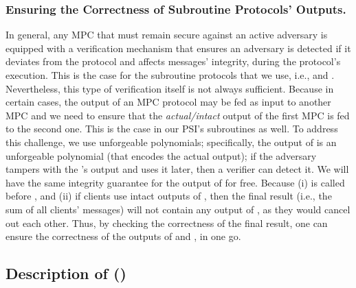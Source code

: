  \subsubsection{Ensuring the Correctness of Subroutine Protocols' Outputs.} 
 
 In general, any MPC that must remain secure against an active adversary is equipped with a verification mechanism that ensures an adversary is detected if it deviates from the protocol and affects messages' integrity, during the protocol's execution. This is the case for the subroutine protocols that we use, i.e., \vopr and \zspaa. Nevertheless, this type of verification itself is not always sufficient. Because in certain cases, the output of an MPC protocol may be fed as input to another MPC and we need to ensure that the \emph{actual/intact} output of the first MPC is fed to the second one. This is the case in our PSI's subroutines as well. To address this challenge, we use unforgeable polynomials; specifically, the output of \vopr is an unforgeable polynomial (that encodes the actual output); if the adversary tampers with the \vopr's output and uses it later, then a verifier can detect it. We will have the same integrity guarantee for the output of \zspaa for free. Because (i) \vopr is called before \zspaa, and (ii) if clients use intact outputs of \zspaa, then the final result (i.e., the sum of all clients' messages) will not contain any output of \zspaa, as they would cancel out each other. Thus, by checking the correctness of the final result, one can ensure the correctness of the outputs of \vopr and \zspaa, in one go. 
 
 
 


  
\subsection{Description of \withFai (\fpsi)}\label{Fair-PSI-Protocol}

